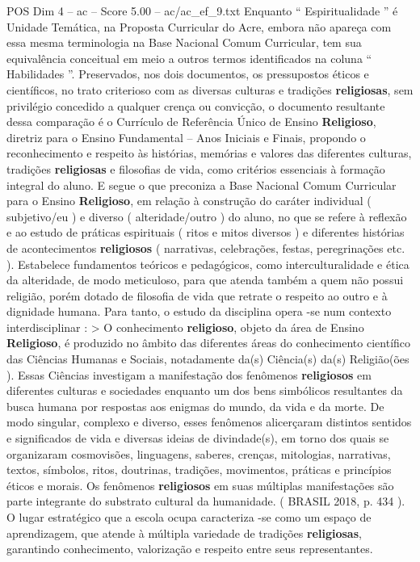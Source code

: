 \begin{textsample}{POS Dim 4 – ac – Score 5.00 – ac/ac\_ef\_9.txt}
Enquanto “ Espiritualidade ” é Unidade Temática, na Proposta Curricular do Acre, embora não apareça com essa mesma terminologia na Base Nacional Comum Curricular, tem sua equivalência conceitual em meio a outros termos identificados na coluna “ Habilidades ”.
Preservados, nos dois documentos, os pressupostos éticos e científicos, no trato criterioso com as diversas culturas e tradições \textbf{religiosas}, sem privilégio concedido a qualquer crença ou convicção, o documento resultante dessa comparação é o Currículo de Referência Único de Ensino \textbf{Religioso}, diretriz para o Ensino Fundamental – Anos Iniciais e Finais, propondo o reconhecimento e respeito às histórias, memórias e valores das diferentes culturas, tradições \textbf{religiosas} e filosofias de vida, como critérios essenciais à formação integral do aluno.
E segue o que preconiza a Base Nacional Comum Curricular para o Ensino \textbf{Religioso}, em relação à construção do caráter individual ( subjetivo/eu ) e diverso ( alteridade/outro ) do aluno, no que se refere à reflexão e ao estudo de práticas espirituais ( ritos e mitos diversos ) e diferentes histórias de acontecimentos \textbf{religiosos} ( narrativas, celebrações, festas, peregrinações etc. ).
Estabelece fundamentos teóricos e pedagógicos, como interculturalidade e ética da alteridade, de modo meticuloso, para que atenda também a quem não possui religião, porém dotado de filosofia de vida que retrate o respeito ao outro e à dignidade humana.
Para tanto, o estudo da disciplina opera -se num contexto interdisciplinar : > O conhecimento \textbf{religioso}, objeto da área de Ensino \textbf{Religioso}, é produzido no âmbito das diferentes áreas do conhecimento científico das Ciências Humanas e Sociais, notadamente da(s) Ciência(s) da(s) Religião(ões ).
Essas Ciências investigam a manifestação dos fenômenos \textbf{religiosos} em diferentes culturas e sociedades enquanto um dos bens simbólicos resultantes da busca humana por respostas aos enigmas do mundo, da vida e da morte.
De modo singular, complexo e diverso, esses fenômenos alicerçaram distintos sentidos e significados de vida e diversas ideias de divindade(s), em torno dos quais se organizaram cosmovisões, linguagens, saberes, crenças, mitologias, narrativas, textos, símbolos, ritos, doutrinas, tradições, movimentos, práticas e princípios éticos e morais.
Os fenômenos \textbf{religiosos} em suas múltiplas manifestações são parte integrante do substrato cultural da humanidade. ( BRASIL 2018, p. 434 ).
O lugar estratégico que a escola ocupa caracteriza -se como um espaço de aprendizagem, que atende à múltipla variedade de tradições \textbf{religiosas}, garantindo conhecimento, valorização e respeito entre seus representantes.

\end{textsample}
